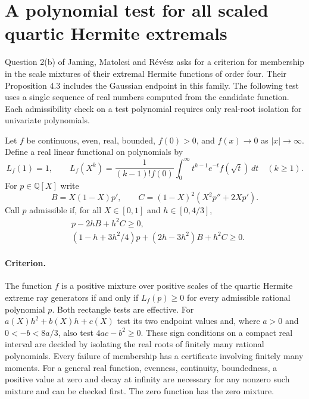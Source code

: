 \documentclass[11pt,a4paper]{article}
\numberwithin{equation}{section}
\begin{document}
\section{A polynomial test for all scaled quartic Hermite extremals}
\label{sec:hermite-test}
Question 2(b) of Jaming, Matolcsi and R\'ev\'esz asks for a criterion
for membership in the scale mixtures of their extremal Hermite functions
of order four. Their Proposition 4.3 includes the Gaussian endpoint in
this family. The following test uses a single sequence of real numbers
computed from the candidate function. Each admissibility check on a test
polynomial requires only real-root isolation for univariate polynomials.

Let $f$ be continuous, even, real, bounded, $f(0)>0$, and $f(x)\to0$
as $|x|\to\infty$. Define a real linear functional on polynomials by
\[
 L_f(1)=1,\qquad L_f(X^k)=\frac1{(k-1)!f(0)}
 \int_0^\infty t^{k-1}e^{-t}f(\sqrt t)\,dt\quad(k\ge1).
\]
For $p\in\mathbb Q[X]$ write
\[
 B=X(1-X)p',\qquad
 C=(1-X)^2(X^2p''+2Xp').
\]
Call $p$ admissible if, for all $X\in[0,1]$ and $h\in[0,4/3]$,
\begin{align*}
 &p-2hB+h^2 C\ge0,\\
 &(1-h+3h^2/4)p+(2h-3h^2)B+h^2 C\ge0.
\end{align*}

\paragraph{Criterion.}
The function $f$ is a positive mixture over positive scales of the
quartic Hermite extreme ray generators if and only if $L_f(p)\ge0$
for every admissible rational polynomial $p$. Both rectangle tests are
effective. For $a(X)h^2+b(X)h+c(X)$ test its two endpoint values and,
where $a>0$ and $0<-b<8a/3$, also test $4ac-b^2\ge0$.
These sign conditions on a compact real interval are decided by isolating
the real roots of finitely many rational polynomials. Every failure of
membership has a certificate involving finitely many moments.
For a general real function, evenness, continuity, boundedness, a positive
value at zero and decay at infinity are necessary for any nonzero such
mixture and can be checked first. The zero function has the zero mixture.
\end{document}
